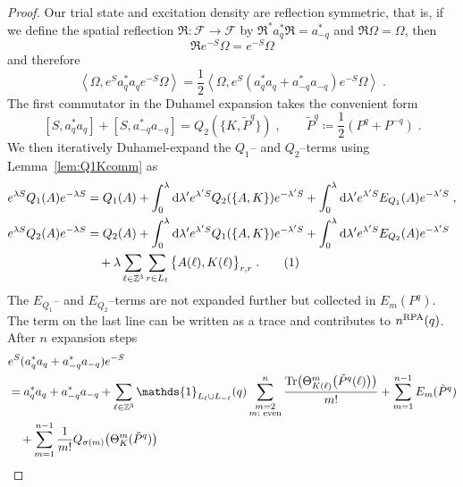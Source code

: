 \documentclass[12pt,a4paper]{article}
\numberwithin{equation}{section}
\newcommand{\cF}{\mathcal{F}}
\newcommand{\fR}{\mathfrak{R}}
\newcommand{\1}{\mathbb{I}}
\newcommand{\di}{\textnormal{d}}
\newcommand{\tagg}[1]{ \stepcounter{equation} \tag{\theequation}
\label{#1} } %
\newcommand{\Zstar}{\mathbb{Z}^3} %
\newcommand{\Z}{\mathbb{Z}}
\newcommand{\half}{\frac{1}{2}}
\newcommand{\eva}[1]{\left\langle #1 \right\rangle}
\theoremstyle{plain}
\theoremstyle{definition}
\theoremstyle{remark}
\theoremstyle{plain}
\theoremstyle{definition}
\theoremstyle{remark}
\begin{document}
\begin{proof}
Our trial state and excitation density are reflection symmetric, that is, if we define the spatial reflection $ \fR: \cF \to \cF $ by $ \fR^* a_q^* \fR = a^*_{-q} $ and $ \fR \Omega = \Omega $, then
\begin{equation} \label{eq:reflectionsymmetry}
	\fR e^{-S} \Omega = e^{-S} \Omega
\end{equation}
and therefore
\begin{equation}
	\eva{\Omega, e^{S} a_q^* a_q e^{-S} \Omega} = \half \eva{\Omega, e^{S} (a_q^* a_q + a_{-q}^* a_{-q}) e^{-S} \Omega} \;.
\end{equation}
The first commutator in the Duhamel expansion takes the convenient form
\begin{equation} \label{eq:firstcommutator}
	[S, a_q^* a_q] + [S, a_{-q}^* a_{-q}]
	= Q_2(\{K,\tilde{P}^q\}) \;, \qquad
	\tilde{P}^q \coloneq \half(P^q + P^{-q}) \;.
\end{equation}
We then iteratively Duhamel-expand the $ Q_1$-- and $ Q_2 $--terms using Lemma~\ref{lem:Q1Kcomm} as
\begin{align*}
	e^{\lambda S} Q_1(A) e^{-\lambda S}
	&= Q_1(A) + \int_0^{\lambda} \di \lambda' e^{\lambda' S} Q_2(\{A,K\}) e^{-\lambda' S}
		+ \int_0^{\lambda} \di \lambda' e^{\lambda' S} E_{Q_1}(A) e^{-\lambda' S} \;, \\
	e^{\lambda S} Q_2(A) e^{-\lambda S}
	&= Q_2(A) + \int_0^{\lambda} \di \lambda' e^{\lambda' S} Q_1(\{A,K\}) e^{-\lambda' S}
		+ \int_0^{\lambda} \di \lambda' e^{\lambda' S} E_{Q_2}(A) e^{-\lambda' S} \\
	&\quad + \lambda \sum_{\ell \in \Zstar} \sum_{r \in L_{\ell}} \big\{ A(\ell), K(\ell) \big\}_{r,r} \;. \tagg{eq:expand}
\end{align*}
The $ E_{Q_1}$-- and $ E_{Q_2} $--terms are not expanded further but collected in $ E_m(P^q) $. The term on the last line can be written as a trace and contributes to $n^\textnormal{RPA}(q)$. After $ n $ expansion steps
\begin{align}
	&e^{S} (a_q^* a_q + a_{-q}^* a_{-q}) e^{-S} \nonumber\\
	&= a_q^* a_q + a_{-q}^* a_{-q}
		+ \sum_{\ell\in \Zstar} \mathds{1}_{L_\ell \cup L_{-\ell}}(q) \sum_{\substack{m=2\\m:\textnormal{ even}}}^n \frac{\mathrm{Tr} \big(\Theta^m_{K(\ell)} \big( \tilde{P}^q(\ell) \big) \big)}{m!}
		+ \sum_{m=1}^{n-1} E_m(\tilde{P}^q) \nonumber\\
	&\quad+ \sum_{m=1}^{n-1}\frac{1}{m!}
		Q_{\sigma(m)}  \big( \Theta^m_{K}(\tilde{P}^q) \big)

\end{align}
\end{proof}
\end{document}
